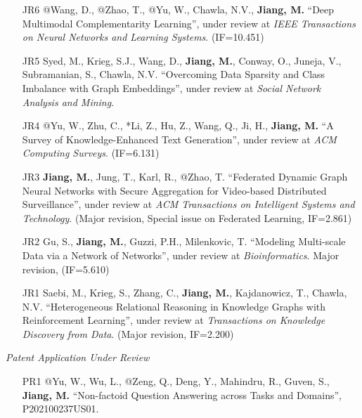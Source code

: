 \documentclass[10pt]{article}
\newenvironment{myindentpar}[1]%
{\begin{list}{}%
         {\setlength{\leftmargin}{#1}}%
         \item[]%
}
{\end{list}}
\newcounter{list}
\begin{document}
\begin{myindentpar}{0.00cm}
\begin{enumerate}[leftmargin=.5cm]

\item[JR6] @Wang, D., @Zhao, T., @Yu, W., Chawla, N.V., \textbf{Jiang, M.} ``Deep Multimodal Complementarity Learning'', under review at \textit{IEEE Transactions on Neural Networks and Learning Systems}. (IF=10.451)	

\item[JR5] Syed, M., Krieg, S.J., Wang, D., \textbf{Jiang, M.}, Conway, O., Juneja, V., Subramanian, S., Chawla, N.V. ``Overcoming Data Sparsity and Class Imbalance with Graph Embeddings'', under review at \textit{Social Network Analysis and Mining}.

\item[JR4] @Yu, W., Zhu, C., *Li, Z., Hu, Z., Wang, Q., Ji, H., \textbf{Jiang, M.} ``A Survey of Knowledge-Enhanced Text Generation'', under review at \textit{ACM Computing Surveys}. (IF=6.131)
	
\item[JR3] \textbf{Jiang, M.}, Jung, T., Karl, R., @Zhao, T. ``Federated Dynamic Graph Neural Networks with Secure Aggregation for Video-based Distributed Surveillance'', under review at \textit{ACM Transactions on Intelligent Systems and Technology}. (Major revision, Special issue on Federated Learning, IF=2.861)
	
\item[JR2] Gu, S., \textbf{Jiang, M.}, Guzzi, P.H., Milenkovic, T. ``Modeling Multi-scale Data via a Network of Networks'', under review at \textit{Bioinformatics}. Major revision, (IF=5.610)
	
\item[JR1] Saebi, M., Krieg, S., Zhang, C., \textbf{Jiang, M.}, Kajdanowicz, T., Chawla, N.V. ``Heterogeneous Relational Reasoning in Knowledge Graphs with Reinforcement Learning'', under review at \textit{Transactions on Knowledge Discovery from Data}. (Major revision, IF=2.200)

\end{enumerate}

\vspace{.2cm}\hspace{-0.25cm}\textit{Patent Application Under Review}

\begin{enumerate}[leftmargin=.5cm]

\item[PR1] @Yu, W., Wu, L., @Zeng, Q., Deng, Y., Mahindru, R., Guven, S., \textbf{Jiang, M.} ``Non-factoid Question Answering across Tasks and Domains'', P202100237US01.


\end{enumerate}
\end{myindentpar}
\end{document}
